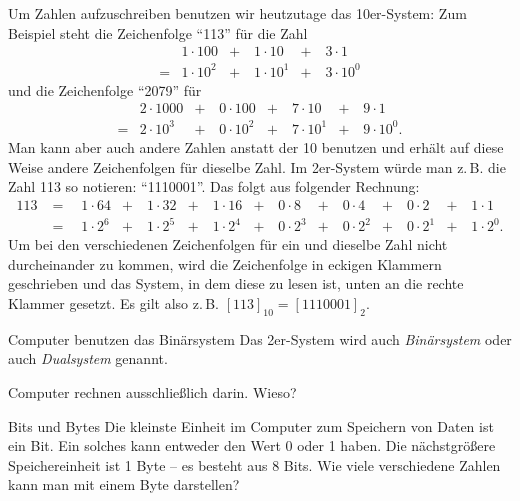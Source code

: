 \documentclass{../../../zirkelblatt}
\begin{document}
Um Zahlen aufzuschreiben benutzen wir heutzutage das 10er-System: Zum Beispiel
steht die Zeichenfolge "`113"' für die Zahl
\[\begin{array}{llll}
& 1 \cdot 100 & + \quad 1 \cdot 10 & + \quad 3 \cdot 1\\
= & 1 \cdot 10^2 & + \quad 1 \cdot 10^1 & + \quad 3 \cdot 10^0
\end{array}\]
und die Zeichenfolge "`2079"' für
\[\begin{array}{lllll}
& 2 \cdot 1000 & + \quad 0 \cdot 100 & + \quad 7 \cdot 10 & + \quad 9 \cdot 1\\
= & 2 \cdot 10^3 & + \quad 0 \cdot 10^2 & + \quad 7 \cdot 10^1 & + \quad 9 \cdot 10^0.
\end{array}\]
Man kann aber auch andere Zahlen anstatt der 10 benutzen und erhält auf diese
Weise andere Zeichenfolgen für dieselbe Zahl. Im 2er-System würde man z.\,B.
die Zahl 113 so notieren: "`1110001"'. Das folgt aus folgender Rechnung:
\[\begin{array}{llllllll}
113 & = \quad 1 \cdot 64 & + \quad 1 \cdot 32 & + \quad 1 \cdot 16 & + \quad 0 \cdot 8 & + \quad 0 \cdot 4 & + \quad 0 \cdot 2 & + \quad 1 \cdot 1\\
& = \quad 1 \cdot 2^6 & + \quad 1 \cdot 2^5 & + \quad 1 \cdot 2^4 & + \quad 0 \cdot 2^3 & + \quad 0 \cdot 2^2 & + \quad 0 \cdot 2^1 & + \quad 1 \cdot 2^0.
\end{array}\]
Um bei den verschiedenen Zeichenfolgen für ein und dieselbe Zahl nicht
durcheinander zu kommen, wird die Zeichenfolge in eckigen Klammern geschrieben
und das System, in dem diese zu lesen ist, unten an die rechte Klammer gesetzt.
Es gilt also z.\,B. $[113]_{10} = [1110001]_2$.

\begin{aufgabe}{Computer benutzen das Binärsystem}
Das 2er-System wird auch \emph{Binärsystem} oder auch \emph{Dualsystem} genannt.

Computer rechnen ausschließlich darin. Wieso?
\end{aufgabe}

\vspace{2cm}

\begin{aufgabe}{Bits und Bytes}
Die kleinste Einheit im Computer zum Speichern von Daten ist ein Bit.
Ein solches kann entweder den Wert 0 oder 1 haben.
Die nächstgrößere Speichereinheit ist 1 Byte -- es besteht aus 8 Bits.
Wie viele verschiedene Zahlen kann man mit einem Byte darstellen?
\end{aufgabe}
\end{document}
